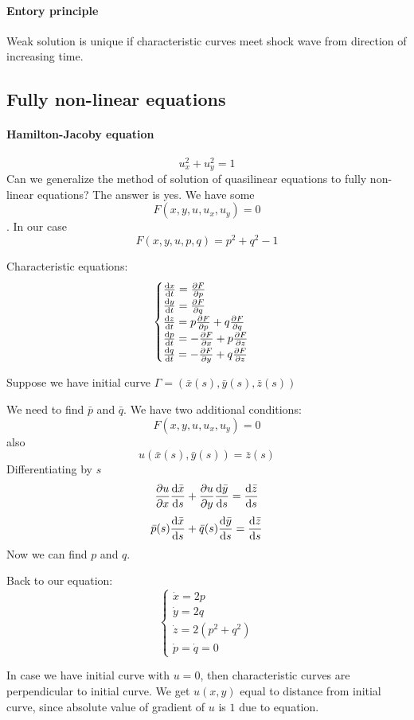 \paragraph{Entory principle}
Weak solution is unique if characteristic curves meet shock wave from direction of increasing time. 


\subsection{Fully non-linear equations}
\paragraph{Hamilton-Jacoby equation}
$$u_x^2+u_y^2=1$$
Can we generalize the method of solution of quasilinear equations to fully non-linear equations? The answer is yes. 
We have some $$F(x,y,u,u_x,u_y) = 0$$. In our case $$F(x,y,u,p,q) = p^2+q^2-1$$

Characteristic equations:
$$\begin{cases}
\dv{x}{t} = \pdv{F}{p}\\
\dv{y}{t} = \pdv{F}{q}\\
\dv{z}{t} = p\pdv{F}{p}+q\pdv{F}{q}\\
\dv{p}{t} = -\pdv{F}{x}+p\pdv{F}{z}\\
\dv{q}{t} = -\pdv{F}{y}+q\pdv{F}{z}\\
\end{cases}$$


Suppose we have initial curve $\Gamma = (\bar{x}(s), \bar{y}(s), \bar{z}(s))$

We need to find $\bar{p}$ and $\bar{q}$. We have two additional conditions:
$$F(x,y,u,u_x,u_y) = 0$$
also
$$u(\bar{x}(s), \bar{y}(s)) = \bar{z}(s)$$
Differentiating by $s$
$$\pdv{u}{x}\dv{\bar{x}}{s}  + \pdv{u}{y}\dv{\bar{y}}{s} = \dv{\bar{z}}{s}$$
$$\bar{p}(s)\dv{\bar{x}}{s} + \bar{q}(s)\dv{\bar{y}}{s} = \dv{\bar{z}}{s}$$
Now we can find $p$ and $q$.

Back to our equation:
$$\begin{cases}
\dot{x} = 2p\\
\dot{y} = 2q\\
\dot{z} = 2(p^2+q^2)\\
\dot{p} = \dot{q} = 0
\end{cases}$$

In case we have initial curve with $u=0$, then characteristic curves are perpendicular to initial curve.  We get $u(x,y)$ equal to distance from initial curve, since absolute value of gradient of $u$ is $1$ due to equation.

